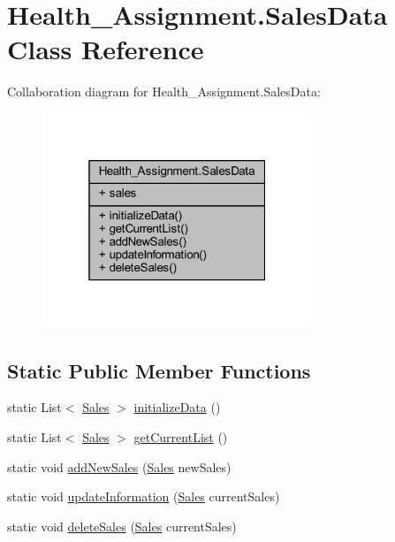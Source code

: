 \hypertarget{class_health___assignment_1_1_sales_data}{}\section{Health\+\_\+\+Assignment.\+Sales\+Data Class Reference}
\label{class_health___assignment_1_1_sales_data}


Collaboration diagram for Health\+\_\+\+Assignment.\+Sales\+Data\+:\nopagebreak
\begin{figure}[H]
\begin{center}
\leavevmode
\includegraphics[width=229pt]{class_health___assignment_1_1_sales_data__coll__graph}
\end{center}
\end{figure}
\subsection*{Static Public Member Functions}
\begin{DoxyCompactItemize}
\item 
static List$<$ \hyperlink{class_health___assignment_1_1_sales}{Sales} $>$ \hyperlink{class_health___assignment_1_1_sales_data_a8904ddfbd29a2cc9895f4ea8b5f06a5d}{initialize\+Data} ()
\item 
static List$<$ \hyperlink{class_health___assignment_1_1_sales}{Sales} $>$ \hyperlink{class_health___assignment_1_1_sales_data_a6fbe82eb1e5f98390ca94130a14e5597}{get\+Current\+List} ()
\item 
static void \hyperlink{class_health___assignment_1_1_sales_data_a9dfbf07570cde45fa90a473b57c9ea82}{add\+New\+Sales} (\hyperlink{class_health___assignment_1_1_sales}{Sales} new\+Sales)
\item 
static void \hyperlink{class_health___assignment_1_1_sales_data_a038ab9373228bf3addb6c0fdddf8eb3c}{update\+Information} (\hyperlink{class_health___assignment_1_1_sales}{Sales} current\+Sales)
\item 
static void \hyperlink{class_health___assignment_1_1_sales_data_a3d84e394686110c7c9532b89949c26a3}{delete\+Sales} (\hyperlink{class_health___assignment_1_1_sales}{Sales} current\+Sales)
\end{DoxyCompactItemize}
